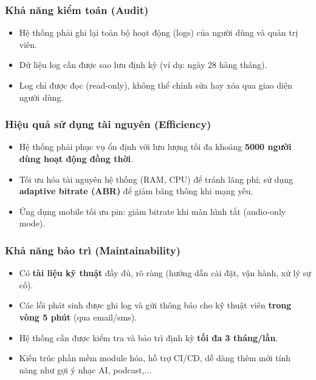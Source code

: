 \documentclass[a4paper]{article}
\begin{document}
\subsubsection{Khả năng kiểm toán (Audit)}
  \begin{itemize}
      \item Hệ thống phải ghi lại toàn bộ hoạt động (logs) của người dùng và quản trị viên.
      \item Dữ liệu log cần được sao lưu định kỳ (ví dụ: ngày 28 hàng tháng).
      \item Log chỉ được đọc (read-only), không thể chỉnh sửa hay xóa qua giao diện người dùng.
  \end{itemize}

\subsubsection{Hiệu quả sử dụng tài nguyên (Efficiency)}
  \begin{itemize}
      \item Hệ thống phải phục vụ ổn định với lưu lượng tối đa khoảng \textbf{5000 người dùng hoạt động đồng thời}.
      \item Tối ưu hóa tài nguyên hệ thống (RAM, CPU) để tránh lãng phí; sử dụng \textbf{adaptive bitrate (ABR)} để giảm băng thông khi mạng yếu.
      \item Ứng dụng mobile tối ưu pin: giảm bitrate khi màn hình tắt (audio-only mode).
  \end{itemize}

\subsubsection{Khả năng bảo trì (Maintainability)}
  \begin{itemize}
      \item Có \textbf{tài liệu kỹ thuật} đầy đủ, rõ ràng (hướng dẫn cài đặt, vận hành, xử lý sự cố).
      \item Các lỗi phát sinh được ghi log và gửi thông báo cho kỹ thuật viên \textbf{trong vòng 5 phút} (qua email/sms).
      \item Hệ thống cần được kiểm tra và bảo trì định kỳ \textbf{tối đa 3 tháng/lần}.
      \item Kiến trúc phần mềm module hóa, hỗ trợ CI/CD, dễ dàng thêm mới tính năng như gợi ý nhạc AI, podcast,...
  \end{itemize}
\end{document}
